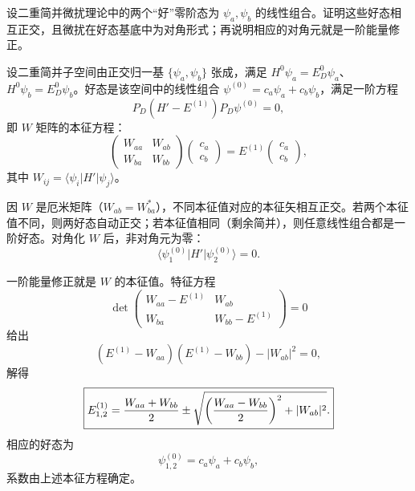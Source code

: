 \begin{question}
设二重简并微扰理论中的两个“好”零阶态为 $\psi_a,\psi_b$ 的线性组合。证明这些好态相互正交，且微扰在好态基底中为对角形式；再说明相应的对角元就是一阶能量修正。
\end{question}
\begin{solution}
设二重简并子空间由正交归一基 $\{\psi_a,\psi_b\}$ 张成，满足 $H^0\psi_a=E_D^0\psi_a$、$H^0\psi_b=E_D^0\psi_b$。好态是该空间中的线性组合 $\psi^{(0)}=c_a\psi_a+c_b\psi_b$，满足一阶方程
\[
P_D(H'-E^{(1)})P_D\psi^{(0)}=0,
\]
即 $W$ 矩阵的本征方程：
\[
\begin{pmatrix}W_{aa}&W_{ab}\\ W_{ba}&W_{bb}\end{pmatrix}
\begin{pmatrix}c_a\\c_b\end{pmatrix}
=E^{(1)}\begin{pmatrix}c_a\\c_b\end{pmatrix},
\]
其中 $W_{ij}=\langle\psi_i|H'|\psi_j\rangle$。

因 $W$ 是厄米矩阵（$W_{ab}=W_{ba}^*$），不同本征值对应的本征矢相互正交。若两个本征值不同，则两好态自动正交；若本征值相同（剩余简并），则任意线性组合都是一阶好态。对角化 $W$ 后，非对角元为零：
\[
\langle\psi_1^{(0)}|H'|\psi_2^{(0)}\rangle=0.
\]

一阶能量修正就是 $W$ 的本征值。特征方程
\[
\det\begin{pmatrix}W_{aa}-E^{(1)}&W_{ab}\\ W_{ba}&W_{bb}-E^{(1)}\end{pmatrix}=0
\]
给出
\[
(E^{(1)}-W_{aa})(E^{(1)}-W_{bb})-|W_{ab}|^2=0,
\]
解得
\[
\boxed{E_{1,2}^{(1)}={W_{aa}+W_{bb}\over2}
\pm\sqrt{\left({W_{aa}-W_{bb}\over2}\right)^2+|W_{ab}|^2}.}
\]
相应的好态为
\[
\psi_{1,2}^{(0)}=c_a\psi_a+c_b\psi_b,
\]
系数由上述本征方程确定。
\end{solution}

